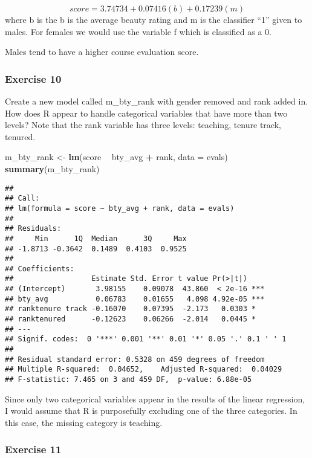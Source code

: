 \documentclass[
]{article}
\newenvironment{Shaded}{\begin{snugshade}}{\end{snugshade}}
\newcommand{\DataTypeTok}[1]{\textcolor[rgb]{0.13,0.29,0.53}{#1}}
\newcommand{\KeywordTok}[1]{\textcolor[rgb]{0.13,0.29,0.53}{\textbf{#1}}}
\newcommand{\NormalTok}[1]{#1}
\newcommand{\OperatorTok}[1]{\textcolor[rgb]{0.81,0.36,0.00}{\textbf{#1}}}
\newcommand{\StringTok}[1]{\textcolor[rgb]{0.31,0.60,0.02}{#1}}
\begin{document}
\[score = 3.74734 + 0.07416(b) + 0.17239(m) \] where b is the b is the
average beauty rating and m is the classifier ``1'' given to males. For
females we would use the variable f which is classified as a 0.

Males tend to have a higher course evaluation score.

\hypertarget{exercise-10}{%
\subsubsection{Exercise 10}\label{exercise-10}}

Create a new model called m\_bty\_rank with gender removed and rank
added in. How does R appear to handle categorical variables that have
more than two levels? Note that the rank variable has three levels:
teaching, tenure track, tenured.

\begin{Shaded}
\begin{Highlighting}[]
\NormalTok{m_bty_rank <-}\StringTok{ }\KeywordTok{lm}\NormalTok{(score }\OperatorTok{~}\StringTok{ }\NormalTok{bty_avg }\OperatorTok{+}\StringTok{ }\NormalTok{rank, }\DataTypeTok{data =}\NormalTok{ evals)}
\KeywordTok{summary}\NormalTok{(m_bty_rank)}
\end{Highlighting}
\end{Shaded}

\begin{verbatim}
## 
## Call:
## lm(formula = score ~ bty_avg + rank, data = evals)
## 
## Residuals:
##     Min      1Q  Median      3Q     Max 
## -1.8713 -0.3642  0.1489  0.4103  0.9525 
## 
## Coefficients:
##                  Estimate Std. Error t value Pr(>|t|)    
## (Intercept)       3.98155    0.09078  43.860  < 2e-16 ***
## bty_avg           0.06783    0.01655   4.098 4.92e-05 ***
## ranktenure track -0.16070    0.07395  -2.173   0.0303 *  
## ranktenured      -0.12623    0.06266  -2.014   0.0445 *  
## ---
## Signif. codes:  0 '***' 0.001 '**' 0.01 '*' 0.05 '.' 0.1 ' ' 1
## 
## Residual standard error: 0.5328 on 459 degrees of freedom
## Multiple R-squared:  0.04652,    Adjusted R-squared:  0.04029 
## F-statistic: 7.465 on 3 and 459 DF,  p-value: 6.88e-05
\end{verbatim}

Since only two categorical variables appear in the results of the linear
regression, I would assume that R is purposefully excluding one of the
three categories. In this case, the missing category is teaching.

\hypertarget{exercise-11}{%
\subsubsection{Exercise 11}\label{exercise-11}}
\end{document}
